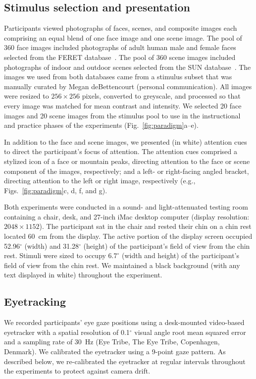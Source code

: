 \documentclass[english]{article}
\begin{document}
\subsection*{Stimulus selection and presentation}
Participants viewed photographs of faces, scenes, and composite images each comprising an equal blend of one face image and one scene image.  The pool of 360 face images included photographs of adult human male and female faces selected from the FERET database~\citep{PhilEtal98}.  The pool of 360 scene images included photographs of indoor and outdoor scenes selected from the SUN database~\citep{XiaoEtal10}.  The images we used from both databases came from a stimulus subset that was manually curated by Megan deBettencourt (personal communication).  All images were resized to $256 \times 256$ pixels, converted to greyscale, and processed so that every image was matched for mean contrast and intensity.  We selected 20 face images and 20 scene images from the stimulus pool to use in the instructional and practice phases of the experiments (Fig.~\ref{fig:paradigm}a--e).

In addition to the face and scene images, we presented (in white) attention cues to direct the participant's focus of attention.  The attention cues comprised a stylized icon of a face or mountain peaks, directing attention to the face or scene component of the images, respectively; and a left- or right-facing angled bracket, directing attention to the left or right image, respectively (e.g., Figs.~\ref{fig:paradigm}c, d, f, and g).

 Both experiments were conducted in a sound- and light-attenuated testing room containing a chair, desk, and 27-inch iMac desktop computer (display resolution: $2048 \times 1152$).  The participant sat in the chair and rested their chin on a chin rest located 60~cm from the display.  The active portion of the display screen occupied 52.96$^\circ$ (width) and 31.28$^\circ$ (height) of the participant's field of view from the chin rest.  Stimuli were sized to occupy $6.7^\circ$ (width and height) of the participant's field of view from the chin rest.  We maintained a black background (with any text displayed in white) throughout the experiment.

\subsection*{Eyetracking}
We recorded participants' eye gaze positions using a desk-mounted video-based eyetracker with a spatial resolution of 0.1$^\circ$ visual angle root mean squared error and a sampling rate of 30~Hz (Eye Tribe, The Eye Tribe, Copenhagen, Denmark).  We calibrated the eyetracker using a 9-point gaze pattern.  As described below, we re-calibrated the eyetracker at regular intervals throughout the experiments to protect against camera drift.
\end{document}
